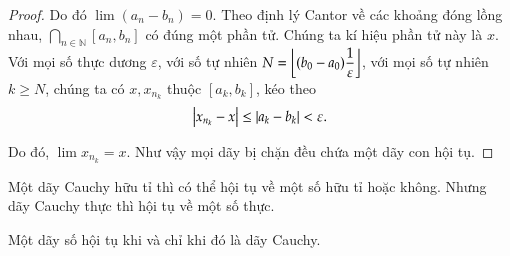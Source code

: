 \begin{proof}
    Do đó $\lim (a_{n} - b_{n}) = 0$. Theo định lý Cantor về các khoảng đóng lồng nhau, $\bigcap_{n\in\mathbb{N}} [a_{n}, b_{n}]$ có đúng một phần tử. Chúng ta kí hiệu phần tử này là $x$.  Với mọi số thực dương $\varepsilon$, với số tự nhiên $N = \left\lfloor{(b_{0} - a_{0})\dfrac{1}{\varepsilon}}\right\rfloor$, với mọi số tự nhiên ${k}\geq N$, chúng ta có $x, x_{n_{k}}$ thuộc $[a_{k}, b_{k}]$, kéo theo
    \[
        \left\vert{x_{n_{k}} - x}\right\vert\leq \left\vert{a_{k} - b_{k}}\right\vert < \varepsilon.
    \]

    Do đó, $\lim x_{n_{k}} = x$. Như vậy mọi dãy bị chặn đều chứa một dãy con hội tụ.
\end{proof}

Một dãy Cauchy hữu tỉ thì có thể hội tụ về một số hữu tỉ hoặc không. Nhưng dãy Cauchy thực thì hội tụ về một số thực.
\begin{appendixthm}
    Một dãy số hội tụ khi và chỉ khi đó là dãy Cauchy.
\end{appendixthm}

